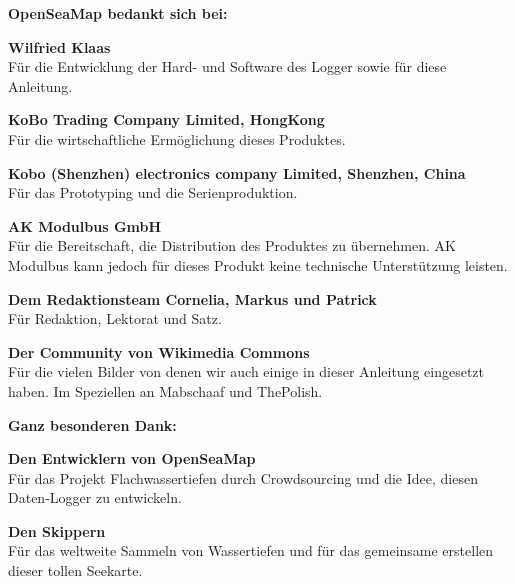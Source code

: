 \documentclass[pdftex, 8pt, paper=130mm:92mm,pagesize]{scrartcl}
\begin{document}
\textbf{OpenSeaMap bedankt sich bei:}

\textbf{Wilfried Klaas}\\
Für die Entwicklung der Hard- und Software des Logger sowie für diese Anleitung.

\textbf{KoBo Trading Company Limited, HongKong}\\
Für die wirtschaftliche Ermöglichung dieses Produktes.

\textbf{Kobo (Shenzhen) electronics company Limited, Shenzhen, China}\\
Für das Prototyping und die Serienproduktion.

\textbf{AK Modulbus GmbH}\\
Für die Bereitschaft, die Distribution des Produktes zu übernehmen. AK Modulbus kann jedoch für dieses Produkt keine technische Unterstützung leisten.

\textbf{Dem Redaktionsteam Cornelia, Markus und Patrick}\\
Für Redaktion, Lektorat und Satz.
\newpage

\textbf{Der Community von Wikimedia Commons}\\
Für die vielen Bilder von denen wir auch einige in dieser Anleitung eingesetzt haben. Im Speziellen an Mabschaaf und ThePolish.

\vspace{2.5cm}

\textbf{Ganz besonderen Dank:}

\textbf{Den Entwicklern von OpenSeaMap}\\
Für das Projekt \glqq Flachwassertiefen durch Crowdsourcing\grqq{} und die Idee, diesen Daten-Logger zu entwickeln.

\textbf{Den Skippern}\\
Für das weltweite Sammeln von Wassertiefen und für das gemeinsame erstellen dieser tollen Seekarte.

\newpage
\thispagestyle{empty}
\hspace{1cm} 
\newpage
\thispagestyle{empty}
\hspace{1cm} 
\end{document}
